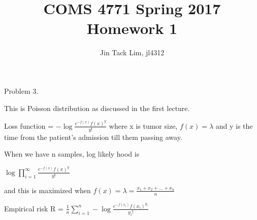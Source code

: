 \documentclass[11pt]{article}
\title{COMS 4771 Spring 2017 Homework 1}
\author{Jin Tack Lim, jl4312
  }
\date{%
  }
\theoremstyle{definition}
\begin{document}
\maketitle



Problem 3.

This is Poisson distribution as discussed in the first lecture.
\bigbreak

Loss function = $-\log \frac{{e^{ - f(x) } f(x) ^y }}{{y!}}$ where x is tumor size, $f(x) = \lambda$ and y is the time from the patient’s admission till them passing away.
\bigbreak

When we have n samples, log likely hood is 
\bigbreak

$ \log \prod_{i=1}^{\infty} \frac{{e^{ - f(x) } f(x) ^y }}{{y!}}$
\bigbreak

and this is maximized when $ f(x) = \lambda  = \frac{x_1 + x_2 + ... + x_n}{n}$
\bigbreak

Empirical risk R = $ \frac{1}{n} \sum_{i=1}^{n} -\log \frac{{e^{ - f(x_i) } f(x_i) ^{y_i} }}{{y_i!}} $
\bigbreak
\end{document}
